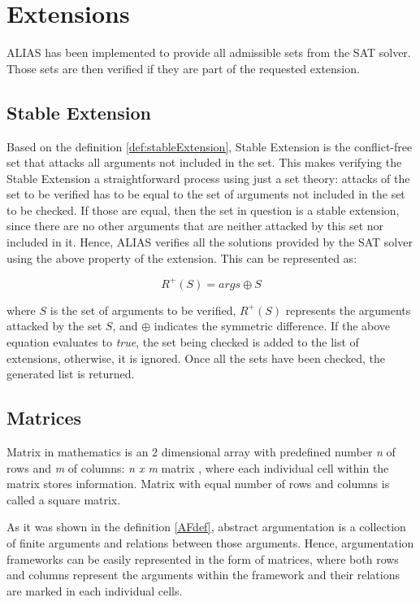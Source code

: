 \section{Extensions}
ALIAS has been implemented to provide all admissible sets from the SAT solver. Those sets are then verified if they are part of the requested extension. 


\subsection{Stable Extension} \label{section:stableExtension}
Based on the definition \ref{def:stableExtension}, Stable Extension is the conflict-free set that attacks all arguments not included in the set. This makes verifying the Stable Extension a straightforward process using just a set theory: attacks of the set to be verified has to be equal to the set of arguments not included in the set to be checked. If those are equal, then the set in question is a stable extension, since there are no other arguments that are neither attacked by this set nor included in it. Hence, ALIAS verifies all the solutions provided by the SAT solver using the above property of the extension. This can be represented as: 

\begin{equation}
R^+(S) = args \oplus S
\end{equation}

where $S$ is the set of arguments to be verified, $R^+(S)$ represents the arguments attacked by the set $S$, and $\oplus$ indicates the symmetric difference. If the above equation evaluates to \textit{true}, the set being checked is added to the list of extensions, otherwise, it is ignored. Once all the sets have been checked, the generated list is returned.

\subsection{Matrices}
Matrix in mathematics is an 2 dimensional array with predefined number \textit{n} of rows and \textit{m} of columns: \textit{n x m} matrix \citep{matrices}, where each individual cell within the matrix stores information. Matrix with equal number of rows and columns is called a square matrix. 

As it was shown in the definition \ref{AFdef}, abstract argumentation is a collection of finite arguments and relations between those arguments. Hence, argumentation frameworks can be easily represented in the form of matrices, where both rows and columns represent the arguments within the framework and their relations are marked in each individual cells. 

